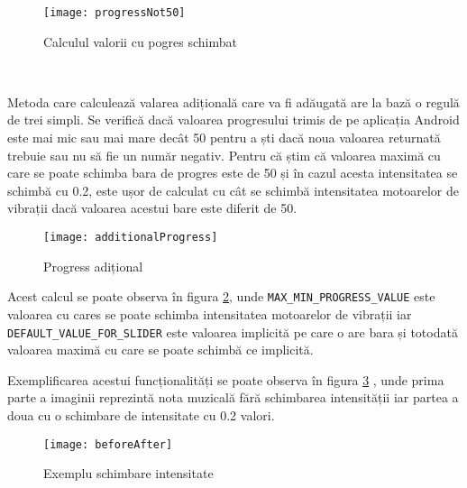 \documentclass[../IoMusT.tex]{subfiles}
\begin{document}
\begin{figure}[h]
\centering
\texttt{[image: progressNot50]}
\caption{Calculul valorii cu pogres schimbat}
\label{fig:not50}
\end{figure} 
\\
\par Metoda care calculează valarea adițională care va fi adăugată are la bază o regulă de trei simpli. Se verifică dacă valoarea progresului trimis de pe aplicația Android este mai mic sau mai mare decât 50 pentru a ști dacă noua valoarea returnată trebuie sau nu să fie un număr negativ. Pentru că știm că valoarea maximă cu care se poate schimba bara de progres este de 50 și în cazul acesta intensitatea se schimbă cu 0.2, este ușor de calculat cu cât se schimbă intensitatea motoarelor de vibrații dacă valoarea acestui bare este diferit de 50.
\begin{figure}[h]
\centering
\texttt{[image: additionalProgress]}
\caption{Progress adițional}
\label{fig:additionalProgress}
\end{figure} 
 Acest calcul se poate observa în figura \ref{fig:additionalProgress}, unde \verb|MAX_MIN_PROGRESS_VALUE| este valoarea cu cares se poate schimba intensitatea motoarelor de vibrații iar \verb|DEFAULT_VALUE_FOR_SLIDER| este valoarea implicită pe care o are bara și totodată valoarea maximă cu care se poate schimbă ce implicită.
\\
\par Exemplificarea acestui funcționalități se poate observa în figura \ref{fig:beforeAfter} , unde prima parte a imaginii reprezintă nota muzicală fără schimbarea intensității iar partea a doua cu o schimbare de intensitate cu 0.2 valori.
\begin{figure}[h]
\centering
\texttt{[image: beforeAfter]}
\caption{Exemplu schimbare intensitate}
\label{fig:beforeAfter}
\end{figure} 
\end{document}

